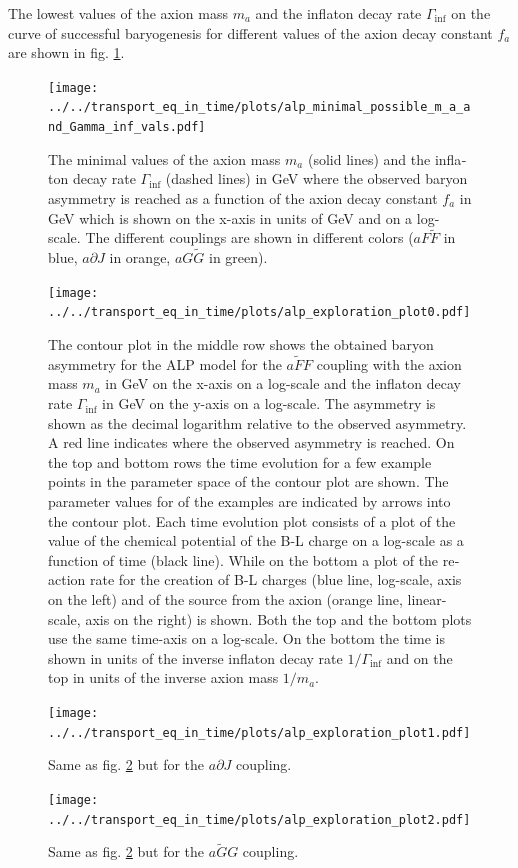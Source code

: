 \documentclass[master,       %
               twoside,        %
               BCOR10mm,       %
               english,ngerman, %
               ]{GAUBM}
\begin{document}
\begin{otherlanguage}{english}
The lowest values of the axion mass $m_a$ and the inflaton decay rate $\Gamma_\mathrm{inf}$ on the curve of successful baryogenesis for different values of the axion decay constant $f_a$ are shown in fig. \ref{fig:alp_mimimal_possible_m_a_and_Gamma_inf_vals}.
\begin{figure}[H]
	\begin{center}
	\texttt{[image: ../../transport\_eq\_in\_time/plots/alp\_minimal\_possible\_m\_a\_and\_Gamma\_inf\_vals.pdf]}
	\caption{The minimal values of the axion mass $m_a$ (solid lines) and the inflaton decay rate  $\Gamma_\mathrm{inf}$ (dashed lines) in GeV where the observed baryon asymmetry is reached as a function of the axion decay constant $f_a$ in GeV which is shown on the x-axis in units of GeV and on a log-scale. The different couplings are shown in different colors ($a F \tilde{F}$ in blue, $a \partial J$ in orange, $a G \tilde{G}$ in green).}
	\end{center}
	\label{fig:alp_mimimal_possible_m_a_and_Gamma_inf_vals}
\end{figure}

\begin{figure}[H]
    \texttt{[image: ../../transport\_eq\_in\_time/plots/alp\_exploration\_plot0.pdf]}
    \caption{The contour plot in the middle row shows the obtained baryon asymmetry for the ALP model for the $a \tilde{F} F$ coupling with the axion mass $m_a$ in GeV on the x-axis on a log-scale and the inflaton decay rate $\Gamma_\mathrm{inf}$ in GeV on the y-axis on a log-scale. The asymmetry is shown as the decimal logarithm relative to the observed asymmetry. A red line indicates where the observed asymmetry is reached. On the top and bottom rows the time evolution for a few example points in the parameter space of the contour plot are shown. The parameter values for of the examples are indicated by arrows into the contour plot. Each time evolution plot consists of a plot of the value of the chemical potential of the B-L charge on a log-scale as a function of time (black line). While on the bottom a plot of the reaction rate for the creation of B-L charges (blue line, log-scale, axis on the left) and of the source from the axion (orange line, linear-scale, axis on the right) is shown.
    	Both the top and the bottom plots use the same time-axis on a log-scale. On the bottom the time is shown in units of the inverse inflaton decay rate $1/\Gamma_\mathrm{inf}$ and on the top in units of the inverse axion mass $1/m_a$.}
    \label{fig:alp_explorations_plot_aFF}
\end{figure}
\begin{figure}[H]
    \texttt{[image: ../../transport\_eq\_in\_time/plots/alp\_exploration\_plot1.pdf]}
    \caption{Same as fig. \ref{fig:alp_explorations_plot_aFF} but for the $a \partial J$ coupling.}
    \label{fig:alp_explorations_plot_aJ}
\end{figure}
\begin{figure}[H]
    \texttt{[image: ../../transport\_eq\_in\_time/plots/alp\_exploration\_plot2.pdf]}
    \caption{Same as fig. \ref{fig:alp_explorations_plot_aFF} but for the $a \tilde{G} G$ coupling.}
    \label{fig:alp_explorations_plot_aGG}
\end{figure}


\end{otherlanguage}
\end{document}
